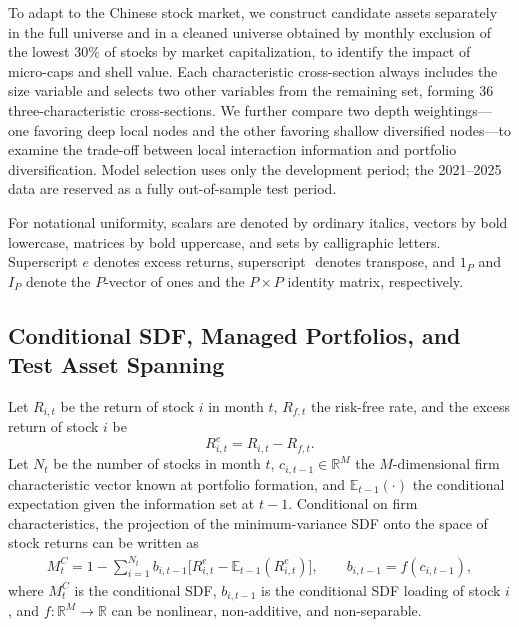 \documentclass[12pt]{article}
\def\bm#1{#1}%
\def\top{}%
\begin{document}
To adapt to the Chinese stock market, we construct candidate assets separately in the full universe and in a cleaned universe obtained by monthly exclusion of the lowest \(30\%\) of stocks by market capitalization, to identify the impact of micro-caps and shell value. Each characteristic cross-section always includes the size variable and selects two other variables from the remaining set, forming 36 three-characteristic cross-sections. We further compare two depth weightings—one favoring deep local nodes and the other favoring shallow diversified nodes—to examine the trade-off between local interaction information and portfolio diversification. Model selection uses only the development period; the 2021–2025 data are reserved as a fully out-of-sample test period.

For notational uniformity, scalars are denoted by ordinary italics, vectors by bold lowercase, matrices by bold uppercase, and sets by calligraphic letters. Superscript \(e\) denotes excess returns, superscript \(\top\) denotes transpose, and \(\bm 1_P\) and \(\bm I_P\) denote the \(P\)-vector of ones and the \(P\times P\) identity matrix, respectively.

\subsection{Conditional SDF, Managed Portfolios, and Test Asset Spanning}
\label{subsec:sdf_spanning}

Let \(R_{i,t}\) be the return of stock \(i\) in month \(t\), \(R_{f,t}\) the risk-free rate, and the excess return of stock \(i\) be
\begin{equation}
  R_{i,t}^{e}=R_{i,t}-R_{f,t}.
  \label{eq:stock_excess_return}
\end{equation}
Let \(N_t\) be the number of stocks in month \(t\), \(\bm c_{i,t-1}\in\mathbb R^M\) the \(M\)-dimensional firm characteristic vector known at portfolio formation, and \(\mathbb E_{t-1}(\cdot)\) the conditional expectation given the information set at \(t-1\). Conditional on firm characteristics, the projection of the minimum-variance SDF onto the space of stock returns can be written as
\begin{equation}
  \begin{aligned}
  M_t^{C}
  =1-\sum_{i=1}^{N_t} b_{i,t-1}
  \bigl[
    R_{i,t}^{e}
    -\mathbb E_{t-1}(R_{i,t}^{e})
  \bigr],
  \qquad
  b_{i,t-1}=f(\bm c_{i,t-1}),
  \end{aligned}
  \label{eq:conditional_sdf}
\end{equation}
where \(M_t^{C}\) is the conditional SDF, \(b_{i,t-1}\) is the conditional SDF loading of stock \(i\), and \(f:\mathbb R^M\rightarrow\mathbb R\) can be nonlinear, non-additive, and non-separable.
\end{document}
